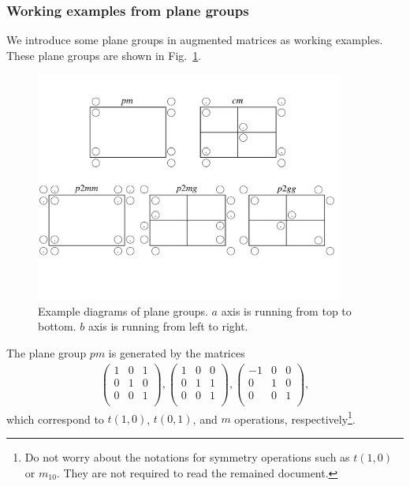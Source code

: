 \subsubsection{Working examples from plane groups}

We introduce some plane groups in augmented matrices as working examples.
These plane groups are shown in Fig.~\ref{fig:plane-group-diagrams}.

\begin{figure}[htb]
  \centering
  \includegraphics[width=0.9\textwidth]{figure/fig_plane_groups.pdf}
  \caption{
    Example diagrams of plane groups.
    $a$ axis is running from top to bottom.
    $b$ axis is running from left to right.
  }
  \label{fig:plane-group-diagrams}
\end{figure}


The plane group $pm$ is generated by the matrices
\begin{align*}
  \left(
    \begin{array}{cc|c}
        1 & 0 & 1 \\
        0 & 1 & 0 \\
        \hline
        0 & 0 & 1 \\
    \end{array}
  \right),
  \left(
    \begin{array}{cc|c}
        1 & 0 & 0 \\
        0 & 1 & 1 \\
        \hline
        0 & 0 & 1 \\
    \end{array}
  \right),
  \left(
    \begin{array}{cc|c}
        -1 & 0 & 0 \\
        0  & 1 & 0 \\
        \hline
        0 & 0 & 1 \\
    \end{array}
  \right),
\end{align*}
which correspond to $t(1, 0)$, $t(0, 1)$, and $m$ operations, respectively\footnote{
  Do not worry about the notations for symmetry operations such as $t(1, 0)$ or $m_{10}$.
  They are not required to read the remained document.
}.

